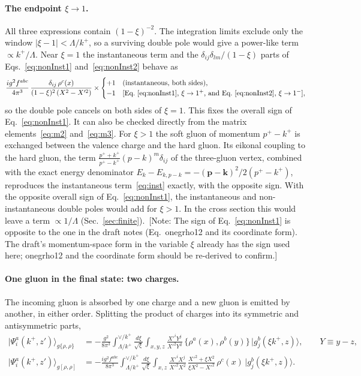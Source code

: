\documentclass[aps,prd,onecolumn,superscriptaddress,nofootinbib,floatfix,longbibliography,11pt]{revtex4-2}
\numberwithin{equation}{section}
\newif\ifshownotes \shownotestrue
\newcommand{\note}[1]{\ifshownotes{\color{red}\,[\textsf{Note:} #1]}\fi}
\begin{document}
\paragraph*{The endpoint $\xi\to1$.} All three expressions contain $(1-\xi)^{-2}$. The integration limits exclude only the window $|\xi-1|<\Lambda/k^+$, so a surviving double pole would give a power-like term $\propto k^+/\Lambda$. Near $\xi=1$ the instantaneous term and the $\delta_{ij}\delta_{lm}/(1-\xi)$ parts of Eqs.~\eqref{eq:nonInst1} and~\eqref{eq:nonInst2} behave as
\begin{equation}
\frac{ig^2f^{abc}}{4\pi^3}\,\frac{\delta_{ij}\,\rho^c(x)}{(1-\xi)^2\,(X^2-X'^2)}\times
\begin{cases}+1&\text{(instantaneous, both sides)},\\ -1&\text{[Eq.~\eqref{eq:nonInst1}, $\xi\to1^+$, and Eq.~\eqref{eq:nonInst2}, $\xi\to1^-$]},\end{cases}
\label{eq:endpoint}
\end{equation}
so the double pole cancels on both sides of $\xi=1$. This fixes the overall sign of Eq.~\eqref{eq:nonInst1}. It can also be checked directly from the matrix elements~\eqref{eq:m2} and~\eqref{eq:m3}. For $\xi>1$ the soft gluon of momentum $p^+-k^+$ is exchanged between the valence charge and the hard gluon. Its eikonal coupling to the hard gluon, the term $\frac{p^++k^+}{p^+-k^+}(p-k)^m\delta_{ij}$ of the three-gluon vertex, combined with the exact energy denominator $E_k-E_{k,p-k}=-(\mathbf p-\mathbf k)^2/2(p^+-k^+)$, reproduces the instantaneous term~\eqref{eq:inst} exactly, with the opposite sign. With the opposite overall sign of Eq.~\eqref{eq:nonInst1}, the instantaneous and non-instantaneous double poles would add for $\xi>1$. In the cross section this would leave a term $\propto1/\Lambda$ (Sec.~\ref{sec:finite}).
\note{The sign of Eq.~\eqref{eq:nonInst1} is opposite to the one in the draft notes (Eq.~onegrho12 and its coordinate form). The draft's momentum-space form in the variable $\xi$ already has the sign used here; onegrho12 and the coordinate form should be re-derived to confirm.}

\paragraph*{One gluon in the final state: two charges.} The incoming gluon is absorbed by one charge and a new gluon is emitted by another, in either order. Splitting the product of charges into its symmetric and antisymmetric parts,
\begin{align}
|\Psi^a_i(k^+,z')\rangle_{g\{\rho,\rho\}}&=-\frac{g^2}{8\pi^3}\int_{\Lambda/k^+}^{\vee/k^+}\frac{d\xi}{\sqrt\xi}\int_{x,y,z}\frac{X'^iY^j}{X'^2Y^2}\,\{\rho^a(x),\rho^b(y)\}\,|g^b_j(\xi k^+,z)\rangle,\qquad Y\equiv y-z,\label{eq:g2rhoS}\\
|\Psi^a_i(k^+,z')\rangle_{g[\rho,\rho]}&=-\frac{ig^2f^{abc}}{8\pi^3}\int_{\Lambda/k^+}^{\vee/k^+}\frac{d\xi}{\sqrt\xi}\int_{x,z}\frac{X'^iX^j}{X'^2X^2}\,\frac{X'^2+\xi X^2}{\xi X^2-X'^2}\,\rho^c(x)\,|g^b_j(\xi k^+,z)\rangle .\label{eq:g2rhoA}
\end{align}
\end{document}
